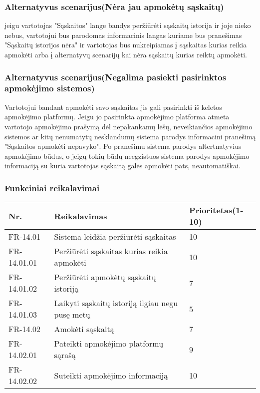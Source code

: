 \documentclass[oneside]{VUMIFPSkursinis}
\begin{document}
	\subsubsection{Alternatyvus scenarijus(Nėra jau apmokėtų sąskaitų)}
	jeigu vartotojas "Sąskaitos" lange bandys peržiūrėti sąskaitų istorija ir joje nieko nebus, vartotojui bus parodomas informacinis langas kuriame bus pranešimas "Sąskaitų istorijos nėra" ir vartotojas bus nukreipiamas į sąskaitas kurias reikia apmokėti arba į alternatyvų scenarijų kai nėra sąskaitų kurias reiktų apmokėti.
	\subsubsection{Alternatyvus scenarijus(Negalima pasiekti pasirinktos apmokėjimo sistemos)}
	Vartotojui bandant apmokėti savo sąskaitas jis gali pasirinkti iš keletos apmokėjimo platformų. Jeigu jo pasirinkta apmokėjimo platforma atmeta vartotojo apmokėjimo prašymą dėl nepakankamų lėšų, neveikiančios apmokėjimo sistemos ar kitų nenumatytų nesklandumų sistema parodys informacini pranešimą "Sąskaitos apmokėti nepavyko". Po pranešimu sistema parodys altertnatyvius apmokėjimo būdus, o jeigų tokių būdų neegzistuos sistema parodys apmokėjimo informaciją su kuria vartotojas sąskaitą galės apmokėti pats, neautomatiškai.
	\subsubsection{Funkciniai reikalavimai}
\begin{table}[htbp]
	\begin{tabularx}{1\textwidth}{ |P{2.5cm}|X|P{3cm }| }  \hline
		Nr. & Reikalavimas & Prioritetas(1-10) \\ \hline
		FR-14.01 & Sistema leidžia peržiūrėti sąskaitas & 10 \\ \hline
		FR-14.01.01& Peržiūrėti sąskaitas kurias reikia apmokėti & 10 \\ \hline
		FR-14.01.02 & Peržiūrėti apmokėtų sąskaitų istoriją & 7 \\ \hline 
		FR-14.01.03 & Laikyti sąskaitų istoriją ilgiau negu pusę metų & 5 \\ \hline
		FR-14.02 & Amokėti sąskaitą & 7 \\ \hline
		FR-14.02.01 & Pateikti apmokėjimo platformų sąrašą & 9 \\ \hline
		FR-14.02.02 & Suteikti apmokėjimo informaciją & 10 \\ \hline
	\end{tabularx}
\end{table}
\end{document}
